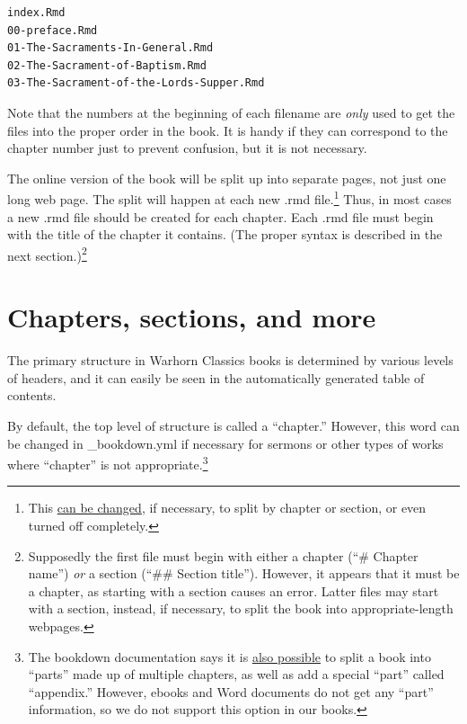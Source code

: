 \documentclass[
]{book}
\begin{document}
\begin{verbatim}
index.Rmd
00-preface.Rmd
01-The-Sacraments-In-General.Rmd
02-The-Sacrament-of-Baptism.Rmd
03-The-Sacrament-of-the-Lords-Supper.Rmd
\end{verbatim}

Note that the numbers at the beginning of each filename are \emph{only} used to get the files into the proper order in the book. It is handy if they can correspond to the chapter number just to prevent confusion, but it is not necessary.

The online version of the book will be split up into separate pages, not just one long web page. The split will happen at each new .rmd file.\footnote{This \href{https://bookdown.org/yihui/bookdown/html.html\#gitbook-style}{can be changed}, if necessary, to split by chapter or section, or even turned off completely.} Thus, in most cases a new .rmd file should be created for each chapter. Each .rmd file must begin with the title of the chapter it contains. (The proper syntax is described in the next section.)\footnote{Supposedly the first file must begin with either a chapter (``\# Chapter name'') \emph{or} a section (``\#\# Section title''). However, it appears that it must be a chapter, as starting with a section causes an error. Latter files may start with a section, instead, if necessary, to split the book into appropriate-length webpages.}

\hypertarget{chapters-sections-and-more}{%
\section{Chapters, sections, and more}\label{chapters-sections-and-more}}

The primary structure in Warhorn Classics books is determined by various levels of headers, and it can easily be seen in the automatically generated table of contents.

By default, the top level of structure is called a ``chapter.'' However, this word can be changed in \_bookdown.yml if necessary for sermons or other types of works where ``chapter'' is not appropriate.\footnote{The bookdown documentation says it is \href{https://bookdown.org/yihui/bookdown/markdown-extensions-by-bookdown.html\#special-headers}{also possible} to split a book into ``parts'' made up of multiple chapters, as well as add a special ``part'' called ``appendix.'' However, ebooks and Word documents do not get any ``part'' information, so we do not support this option in our books.}
\end{document}
